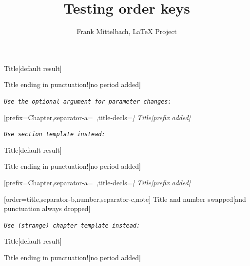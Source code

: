 \documentclass{article}
\newcommand\mynotes[1]{\par\noindent\texttt{\itshape #1}\par\medskip}
\begin{document}
\title{Testing order keys}
\author{Frank Mittelbach, \LaTeX{} Project}
\maketitle


\DebugTemplatesOn

     {Title}[default result]

     {Title ending in punctuation!}[no period added]


\mynotes{Use the optional argument for parameter changes:}

     [prefix=Chapter,separator-a=\ ,title-decls=\itshape]
     {Title}[prefix added]


\mynotes{Use section template instead:}

     {Title}[default result]

     {Title ending in punctuation!}[no period added]


     [prefix=Chapter,separator-a=\ ,title-decls=\itshape]
     {Title}[prefix added]


    [order={title,separator-b,number,separator-c,note}]
    {Title and number swapped}[and punctuation always dropped]


\mynotes{Use (strange) chapter template instead:}

     {Title}[default result]

     {Title ending in punctuation!}[no period added]
\end{document}
